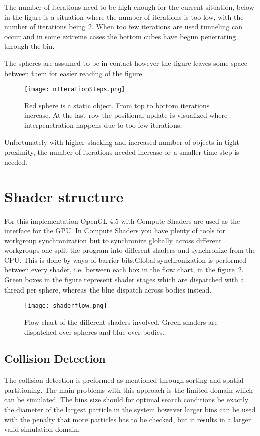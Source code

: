 The number of iterations need to be high enough for the current situation, below
in the figure is a situation where the number of iterations is too low, with the
number of iterations being 2. When too few iterations are used tunneling can occur
and in some extreme cases the bottom cubes have begun penetrating through the bin.

The spheres are assumed to be in contact however
the figure leaves some space between them for easier reading of the figure.

\begin{figure}[H]
  \centering
  \texttt{[image: nIterationSteps.png]}
  \caption{Red sphere is a static object. From top to bottom iterations increase. At the last row the positional update is visualized where interpenetration happens due to too few iterations.}
  \label{fig:flow}
\end{figure}

Unfortunately with higher stacking and increased number of objects in tight proximity,
the number of iterations needed increase or a smaller time step is needed.

\section{Shader structure}
For this implementation OpenGL 4.5 with Compute Shaders are used as the interface
for the GPU. In Compute Shaders you have plenty of tools for workgroup synchronization
but to synchronize globally across different workgroups one split the program into
different shaders and synchronize from the CPU. This is done by ways of barrier bits.Global synchronization
is performed between every shader, i.e. between each box in the flow chart, in the figure~\ref{fig:flow}. Green
boxes in the figure represent shader stages which are dispatched with a thread per
sphere, whereas the blue dispatch across bodies instead.

\begin{figure}[H]
  \centering
  \texttt{[image: shaderflow.png]}
  \caption{Flow chart of the different shaders involved. Green shaders are dispatched over spheres and blue over bodies.}
  \label{fig:flow}
\end{figure}


\subsection{Collision Detection}
The collision detection is preformed as mentioned through sorting and spatial partitioning.
The main problems with this approach is the limited domain which can be simulated.
The bins size should for optimal search conditions be exactly the diameter of the largest
particle in the system however larger bins can be used with the penalty that more
particles has to be checked, but it results in a larger valid simulation domain.

